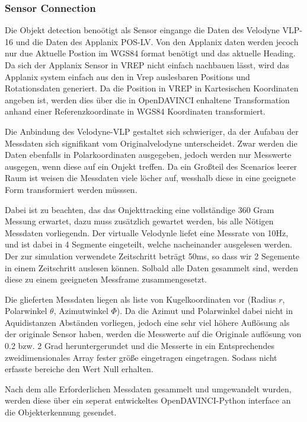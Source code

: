 \documentclass[11pt,oneside,openright]{mpreport}
\begin{document}
\subsubsection{Sensor Connection}
Die Objekt detection benoötigt als Sensor eingange die Daten des Velodyne VLP-16 und die Daten des Applanix POS-LV. Von den Applanix daten werden jecoch nur
due Aktuelle Postion im WGS84 format benötigt und das aktuelle Heading. Da sich der Applanix Sensor in VREP nicht einfach nachbauen lässt,
wird das Applanix system einfach aus den in Vrep auslesbaren Positions und Rotationsdaten generiert. Da die Position in VREP in Kartesischen Koordinaten
angeben ist, werden dies über die in OpenDAVINCI enhaltene Transformation anhand einer Referenzkoordinate in WGS84 Koordinaten transformiert.

Die Anbindung des Velodyne-VLP gestaltet sich schwieriger, da der Aufabau der Messdaten sich signifikant vom Originalvelodyne unterscheidet.
Zwar werden die Daten ebenfalls in Polarkoordinaten ausgegeben, jedoch werden nur Messwerte ausgegen, wenn diese auf ein Onjekt treffen. Da ein Großteil des Scenarios leerer Raum ist
weisen die Messdaten viele löcher auf, wesshalb diese in eine geeignete Form transformiert werden müsssen.

Dabei ist zu beachten, das das Onjekttracking eine vollständige 360 Gram Messung erwartet, dazu muss zusätzlich gewartet werden, bis alle Nötigen Messdaten vorliegendn.
Der virtualle Velodynle liefet eine Messrate von 10Hz, und ist dabei in 4 Segmente eingeteilt, welche nacheinander ausgelesen werden. Der zur simulation verwendete Zeitschritt
beträgt 50ms, so dass wir 2 Segemente in einem Zeitschritt auslesen können. Solbald alle Daten gesammelt sind, werden diese zu einem geeigneten Messframe zusammengesetzt.

Die glieferten Messdaten liegen als liste von Kugelkoordinaten vor (Radius $r$, Polarwinkel $\theta$, Azimutwinkel $\Phi$). Da die Azimut und Polarwinkel dabei nicht in Aquidistanzen Abständen
vorliegen, jedoch eine sehr viel höhere Auflösung als der originale Sensor haben, werden die Messwerte auf die Originale auflösung von 0.2 bzw. 2 Grad heruntergerundet und die Messerte in ein
Entsprechendes zweidimensionales Array fester größe eingetragen eingetragen. Sodass nicht erfasste bereiche den Wert Null erhalten.

Nach dem alle Erforderlichen Messdaten gesammelt und umgewandelt wurden, werden diese über ein seperat  entwickeltes OpenDAVINCI-Python interface an die Objekterkennung gesendet.
\end{document}
